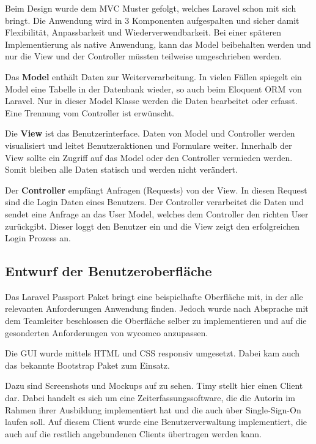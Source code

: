 Beim Design wurde dem MVC Muster gefolgt, welches Laravel schon mit sich bringt. Die Anwendung wird in 3 Komponenten aufgespalten und sicher damit Flexibilität, Anpassbarkeit und Wiederverwendbarkeit.
Bei einer späteren Implementierung als native Anwendung, kann das Model beibehalten werden und nur die View und der Controller müssten teilweise umgeschrieben werden.

Das \textbf{Model} enthält Daten zur Weiterverarbeitung. In vielen Fällen spiegelt ein Model
eine Tabelle in der Datenbank wieder, so auch beim Eloquent ORM von Laravel. Nur in dieser Model Klasse werden die Daten bearbeitet oder erfasst. Eine Trennung vom Controller ist erwünscht.

Die \textbf{View} ist das Benutzerinterface. Daten von Model und Controller werden visualisiert und leitet \zB Benutzeraktionen und Formulare weiter. Innerhalb der View sollte ein Zugriff auf das Model oder den Controller vermieden werden. Somit bleiben alle Daten statisch und werden nicht verändert.

Der \textbf{Controller} empfängt Anfragen (Requests) von der View. In diesen Request sind \bspw die Login Daten eines Benutzers. Der Controller verarbeitet die Daten und sendet eine Anfrage an das User Model, welches dem Controller den richten User zurückgibt. Dieser loggt den Benutzer ein und die View zeigt den erfolgreichen Login Prozess an. 



\subsection{Entwurf der Benutzeroberfläche}
\label{sec:Benutzeroberflaeche} 

Das Laravel Passport Paket bringt eine beispielhafte Oberfläche mit, in der alle relevanten Anforderungen Anwendung finden. Jedoch wurde nach Absprache mit dem Teamleiter beschlossen die Oberfläche selber zu implementieren und auf die gesonderten Anforderungen von wycomco  anzupassen.

Die \acs{GUI} wurde mittels HTML und CSS responsiv umgesetzt. Dabei kam auch das bekannte Bootstrap Paket zum Einsatz. 

Dazu sind Screenshots und Mockups auf   zu sehen. Timy stellt hier einen Client dar. Dabei handelt es sich um eine Zeiterfassungssoftware, die die Autorin im Rahmen ihrer Ausbildung implementiert hat und die auch über Single-Sign-On laufen soll. Auf diesem Client wurde eine Benutzerverwaltung implementiert, die auch auf die restlich angebundenen Clients übertragen werden kann. 

